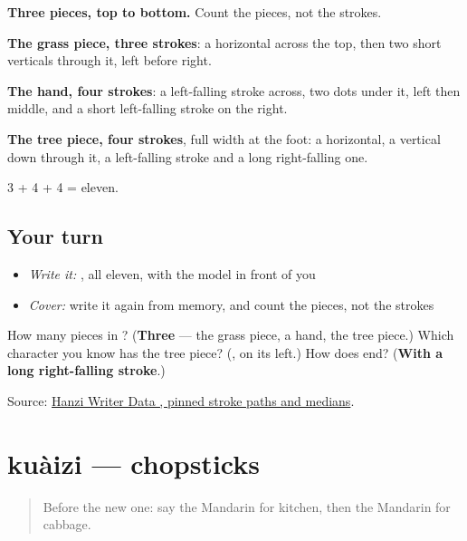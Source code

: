 \begin{quote}
\end{quote}

\textbf{Three pieces, top to bottom.} Count the pieces, not the strokes.

\textbf{The grass piece, three strokes}: a horizontal across the top, then two short verticals through it, left before right.

\textbf{The hand, four strokes}: a left-falling stroke across, two dots under it, left then middle, and a short left-falling stroke on the right.

\textbf{The tree piece, four strokes}, full width at the foot: a horizontal, a vertical down through it, a left-falling stroke and a long right-falling one.

3 + 4 + 4 = eleven.

\subsection*{Your turn}
\begin{itemize}
\raggedright
  \item \emph{Write it:} , all eleven, with the model in front of you
  \item \emph{Cover:} write it again from memory, and count the pieces, not the strokes
\end{itemize}

\begin{tcolorbox}[breakable,colback=teal!4,colframe=teal!35!black,title={Before you move on}]
How many pieces in ? (\textbf{Three} — the grass piece, a hand, the tree piece.) Which character you know has the tree piece? (\textbf{}, on its left.) How does  end? (\textbf{With a long right-falling stroke}.)

Source: \href{https://raw.githubusercontent.com/chanind/hanzi-writer-data/68d10a4b21150cae5e1ebbd223eed289cf32d90c/data/\%E8\%8F\%9C.json}{Hanzi Writer Data , pinned stroke paths and medians}.
\end{tcolorbox}
\section[kuàizi]{kuàizi — chopsticks}

\label{lesson:ZH-C101-kuaizi}



\begin{quote}
Before the new one: say the Mandarin for kitchen, then the Mandarin for cabbage.
\end{quote}

